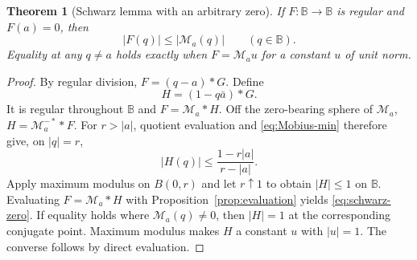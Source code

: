 \documentclass[11pt,a4paper]{article}
\numberwithin{equation}{section}
\newtheorem{theorem}{Theorem}[section]
\theoremstyle{definition}
\theoremstyle{remark}
\newcommand{\BB}{\mathbb B}
\begin{document}
\begin{theorem}[Schwarz lemma with an arbitrary zero]
\label{thm:schwarz-zero}
If $F:\BB\to\BB$ is regular and $F(a)=0$, then
\begin{equation}
 |F(q)|\le|\mathcal M_a(q)|\qquad(q\in\BB).
 \label{eq:schwarz-zero}
\end{equation}
Equality at any $q\ne a$ holds exactly when $F=\mathcal M_a u$ for a
constant $u$ of unit norm.
\end{theorem}
\begin{proof}
By regular division, $F=(q-a)*G$. Define
\[
 H=(1-q\bar a)*G.
\]
It is regular throughout $\BB$ and $F=\mathcal M_a*H$.
Off the zero-bearing sphere of $\mathcal M_a$,
$H=\mathcal M_a^{-*}*F$. For $r>|a|$, quotient evaluation and
\eqref{eq:Mobius-min} therefore give, on $|q|=r$,
\[
 |H(q)|\le\frac{1-r|a|}{r-|a|}.
\]
Apply maximum modulus on $B(0,r)$ and let $r\uparrow1$ to obtain $|H|\le1$
on $\BB$. Evaluating $F=\mathcal M_a*H$ with
Proposition~\ref{prop:evaluation} yields \eqref{eq:schwarz-zero}.
If equality holds where $\mathcal M_a(q)\ne0$, then $|H|=1$ at the
corresponding conjugate point. Maximum modulus makes $H$ a constant $u$
with $|u|=1$. The converse follows by direct evaluation.
\end{proof}
\end{document}
